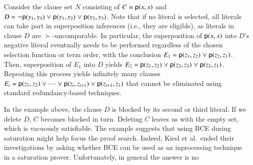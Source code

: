 \begin{exa}
   \label{example:infinite-blocked-set}
   Consider the clause set $N$ consisting of $C = {\mathsf{p}(x,x)}$ and
   $D = \neg{\kern.2ex \mathsf{p}(y_1,y_3)} \mathrel{\lor} {\mathsf{p}(y_1,y_2)} \mathrel{\lor}
   {\mathsf{p}(y_2,y_3)}$. Note that if no literal is selected, all
   literals can take part in superposition inferences (i.e., they are eligible), as literals in
   clause $D$ are $\succ$-uncomparable. In particular, the superposition of
   ${\mathsf{p}(x,x)}$ into $D$'s negative literal eventually needs to
   be performed regardless of the chosen selection function or term order, with
   the conclusion $E_1 = {\mathsf{p}(z_1,z_2)} \mathrel{\lor}
   {\mathsf{p}(z_2,z_1)}$. Then, superposition of $E_1$ into $D$ yields
   $E_2 = {\mathsf{p}(z_1,z_2)} \mathrel{\lor} {\mathsf{p}(z_2,z_3)} \mathrel{\lor}
   {\mathsf{p}(z_3,z_1)}$. Repeating this process yields infinitely many
   clauses $E_i = {\mathsf{p}(z_1,z_2)} \mathrel{\lor} \cdots \mathrel{\lor}
   {\mathsf{p}(z_i,z_{i+1})} \mathrel{\lor} {\mathsf{p}(z_{i+1},z_1)}$
   that cannot be eliminated using standard redu\-ndancy-based techniques.
\end{exa}

In the example above, the clause $D$ is blocked by its second or third
literal. If we delete $D$, $C$ becomes blocked in turn. Deleting
$C$ leaves us with the empty set, which is vacuously satisfiable. The example
suggests that using BCE during saturation might help focus the proof search.
Indeed, Kiesl et al.\ ended their investigations by asking whether BCE can be
used as an inprocessing technique in a saturation prover. Unfortunately,
in general the answer is no


